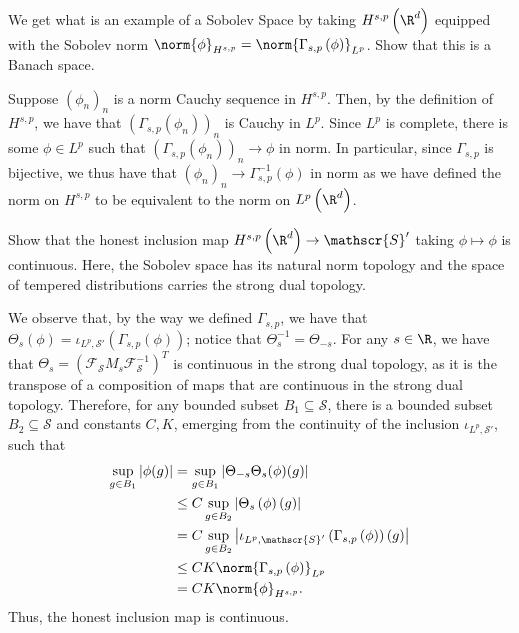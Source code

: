\documentclass[10pt]{mypackage}
\begin{document}
\begin{problem}
  We get what is an example of a Sobolev Space by taking $H^{s,p}\left( \R^d \right)$ equipped with the Sobolev norm $\norm{\phi}_{H^{s,p}} = \norm{\Gamma_{s,p}\left( \phi \right)}_{L^p}$. Show that this is a Banach space.
\end{problem}
\begin{solution}
  Suppose $\left( \phi_n \right)_n$ is a norm Cauchy sequence in $H^{s,p}$. Then, by the definition of $H^{s,p}$, we have that $\left( \Gamma_{s,p}\left( \phi_n \right) \right)_{n}$ is Cauchy in $L^p$. Since $L^p$ is complete, there is some $\phi\in L^p$ such that $\left( \Gamma_{s,p}\left( \phi_n \right) \right)_{n}\to \phi$ in norm. In particular, since $\Gamma_{s,p}$ is bijective, we thus have that $\left( \phi_n \right)_n\to \Gamma_{s,p}^{-1}\left( \phi \right)$ in norm as we have defined the norm on $H^{s,p}$ to be equivalent to the norm on $L^p\left( \R^d \right)$.
\end{solution}
\begin{problem}
  Show that the honest inclusion map $H^{s,p}\left( \R^d \right)\to \mathscr{S}'$ taking $\phi\mapsto \phi$ is continuous. Here, the Sobolev space has its natural norm topology and the space of tempered distributions carries the strong dual topology.
\end{problem}
\begin{solution}
  We observe that, by the way we defined $\Gamma_{s,p}$, we have that $\Theta_s\left( \phi \right) = \iota_{L^p,\mathscr{S}'}\left( \Gamma_{s,p}(\phi) \right)$; notice that $\Theta_{s}^{-1} = \Theta_{-s}$. For any $s\in \R$, we have that $\Theta_{s} = \left( \mathcal{F}_{\mathscr{S}}M_s\mathcal{F}_{\mathscr{S}}^{-1} \right)^{T}$ is continuous in the strong dual topology, as it is the transpose of a composition of maps that are continuous in the strong dual topology. Therefore, for any bounded subset $B_1\subseteq \mathscr{S}$, there is a bounded subset $B_2\subseteq \mathscr{S}$ and constants $C,K$, emerging from the continuity of the inclusion $\iota_{L^p,\mathscr{S}'}$, such that
  \begin{align*}
    \sup_{g\in B_1} \left\vert \phi(g) \right\vert &= \sup_{g\in B_1} \left\vert \Theta_{-s}\Theta_{s}(\phi)(g) \right\vert\\
                                                   &\leq C\sup_{g\in B_2}\left\vert \Theta_{s}\left( \phi \right)(g) \right\vert\\
                                                   &= C\sup_{g\in B_2} \left\vert \iota_{L^p,\mathscr{S}'}\left( \Gamma_{s,p}\left( \phi \right) \right)(g) \right\vert\\
                                                   &\leq CK\norm{\Gamma_{s,p}\left( \phi \right)}_{L^p}\\
                                                   &= CK\norm{\phi}_{H^{s,p}}.
  \end{align*}
  Thus, the honest inclusion map is continuous.
\end{solution}
\end{document}
